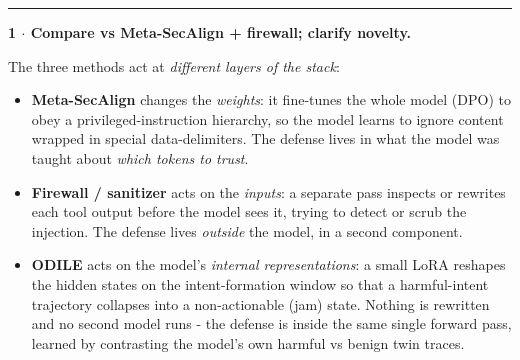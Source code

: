 \documentclass[11pt]{article}
\begin{document}
\vspace{2pt}\hrule\vspace{4pt}

\vspace{4pt}\par

\textbf{1 $\cdot$ Compare vs Meta-SecAlign + firewall; clarify novelty.}\par
The three methods act at \emph{different layers of the stack}:\par
\begin{itemize}
\item \textbf{Meta-SecAlign} changes the \emph{weights}: it fine-tunes the whole model (DPO) to obey a privileged-instruction hierarchy, so the model learns to ignore content wrapped in special data-delimiters. The defense lives in what the model was taught about \emph{which tokens to trust}.
\item \textbf{Firewall / sanitizer} acts on the \emph{inputs}: a separate pass inspects or rewrites each tool output before the model sees it, trying to detect or scrub the injection. The defense lives \emph{outside} the model, in a second component.
\item \textbf{ODILE} acts on the model's \emph{internal representations}: a small LoRA reshapes the hidden states on the intent-formation window so that a harmful-intent trajectory collapses into a non-actionable (jam) state. Nothing is rewritten and no second model runs - the defense is inside the same single forward pass, learned by contrasting the model's own harmful vs benign twin traces.
\end{itemize}
\end{document}
